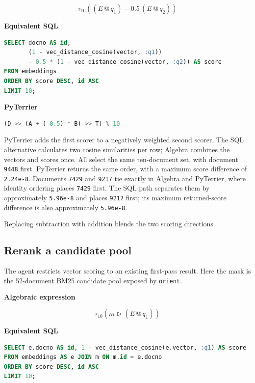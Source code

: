 \documentclass{article}
\makeatletter
\newcommand{\matmul}{\mathbin{@}}
\makeatother
\begin{document}
\[
  \tau_{10}\!\left((E\matmul q_1)-0.5\,(E\matmul q_2)\right)
\]

\textbf{Equivalent SQL}

\begin{lstlisting}[language=SQL]
SELECT docno AS id,
       (1 - vec_distance_cosine(vector, :q1))
       - 0.5 * (1 - vec_distance_cosine(vector, :q2)) AS score
FROM embeddings
ORDER BY score DESC, id ASC
LIMIT 10;
\end{lstlisting}

\textbf{PyTerrier}

\begin{lstlisting}[language=Python]
(D >> (A + (-0.5) * B) >> T) % 10
\end{lstlisting}

PyTerrier adds the first scorer to a negatively weighted second scorer. The SQL alternative calculates two cosine similarities per row; Algebra combines the vectors and scores once. All select the same ten-document set, with document \texttt{9448} first. PyTerrier returns the same order, with a maximum score difference of \texttt{2.24e-8}. Documents \texttt{7429} and \texttt{9217} tie exactly in Algebra and PyTerrier, where identity ordering places \texttt{7429} first. The SQL path separates them by approximately \texttt{5.96e-8} and places \texttt{9217} first; its maximum returned-score difference is also approximately \texttt{5.96e-8}.

Replacing subtraction with addition blends the two scoring directions.

\hypertarget{rerank-a-candidate-pool}{%
\subsection{Rerank a candidate pool}\label{rerank-a-candidate-pool}}

The agent restricts vector scoring to an existing first-pass result. Here the mask is the 52-document BM25 candidate pool exposed by \texttt{orient}.

\textbf{Algebraic expression}

\[
  \tau_{10}\!\left(m\triangleright(E\matmul q_1)\right)
\]

\textbf{Equivalent SQL}

\begin{lstlisting}[language=SQL]
SELECT e.docno AS id, 1 - vec_distance_cosine(e.vector, :q1) AS score
FROM embeddings AS e JOIN m ON m.id = e.docno
ORDER BY score DESC, id ASC
LIMIT 10;
\end{lstlisting}
\end{document}
